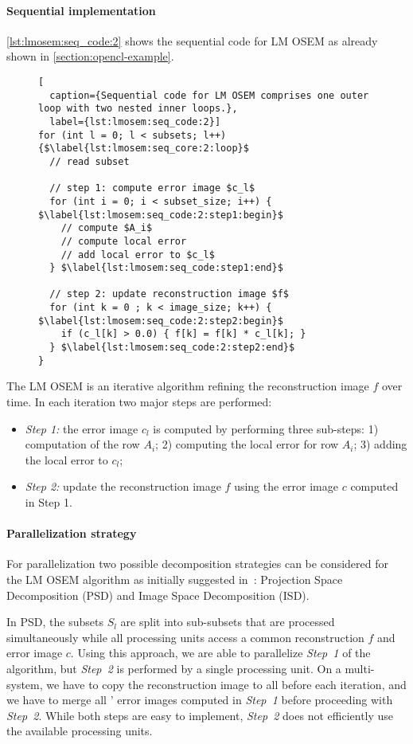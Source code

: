 \paragraph{Sequential implementation}
\autoref{lst:lmosem:seq_code:2} shows the sequential code for LM OSEM as already shown in \autoref{section:opencl-example}.
%
\begin{figure}
\begin{lstlisting}[
  caption={Sequential code for LM OSEM comprises one outer loop with two nested inner loops.},
  label={lst:lmosem:seq_code:2}]
for (int l = 0; l < subsets; l++) {$\label{lst:lmosem:seq_core:2:loop}$
  // read subset

  // step 1: compute error image $c_l$
  for (int i = 0; i < subset_size; i++) { $\label{lst:lmosem:seq_code:2:step1:begin}$
    // compute $A_i$
    // compute local error
    // add local error to $c_l$
  } $\label{lst:lmosem:seq_code:step1:end}$

  // step 2: update reconstruction image $f$
  for (int k = 0 ; k < image_size; k++) { $\label{lst:lmosem:seq_code:2:step2:begin}$
    if (c_l[k] > 0.0) { f[k] = f[k] * c_l[k]; }
  } $\label{lst:lmosem:seq_code:2:step2:end}$
}
\end{lstlisting}
\end{figure}
%
The LM OSEM is an iterative algorithm refining the reconstruction image $f$ over time.
In each iteration two major steps are performed:
\begin{itemize}
  \item[] \emph{Step 1:} the error image $c_l$ is computed by performing three sub-steps: 1) computation of the row $A_i$; 2) computing the local error for row $A_i$; 3) adding the local error to $c_l$;
  \item[] \emph{Step 2:} update the reconstruction image $f$ using the error image $c$ computed in Step 1.
\end{itemize}

\paragraph{Parallelization strategy}
For parallelization two possible decomposition strategies can be considered for the LM OSEM algorithm as initially suggested in~\cite{JonesJoKeNeReLeByBaMiCa2002}: Projection Space Decomposition (PSD) and Image Space Decomposition (ISD).

In PSD, the subsets $S_l$ are split into sub-subsets that are processed simultaneously while all processing units access a common reconstruction $f$ and error image $c$.
Using this approach, we are able to parallelize \emph{Step~1} of the algorithm, but \emph{Step~2} is performed by a single processing unit.
On a multi-\GPU system, we have to copy the reconstruction image to all \GPUs before each iteration, and we have to merge all \GPUs' error images computed in \emph{Step~1} before proceeding with \emph{Step~2}.
While both steps are easy to implement, \emph{Step~2} does not efficiently use the available processing units.

